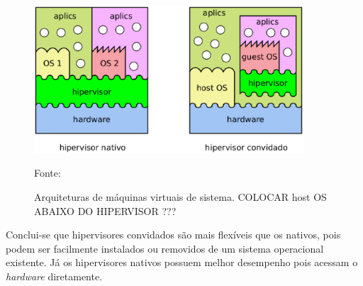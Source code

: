 \begin{figure}[vms_arquiteturas]
 \centering
 \includegraphics[width=380px]{img/vms_arquiteturas.eps}
 \caption{Arquiteturas de máquinas virtuais de sistema. COLOCAR host OS ABAIXO DO HIPERVISOR ???}
 \label{fig:vms_arquiteturas}
 Fonte: \citet{maziero2013}
\end{figure}

Conclui-se que hipervisores convidados são mais flexíveis que os nativos, pois podem ser facilmente instalados ou removidos de um sistema
operacional existente. Já os hipervisores nativos possuem melhor desempenho pois acessam o \textit{hardware} diretamente.


